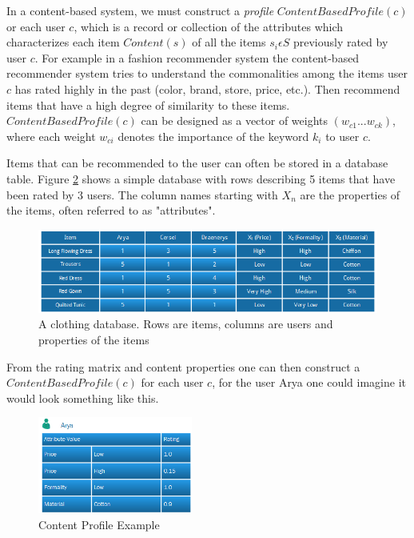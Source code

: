 In a content-based system, we must construct a \emph{profile} $ContentBasedProfile(c)$ or each user $c$, which is a record or collection of the attributes which characterizes each item $Content(s)$ of all the items $s_{i} \epsilon S$ previously rated by user $c$. For example in a fashion recommender system the content-based recommender system tries to understand the commonalities among the items user $c$ has rated highly in the past (color, brand, store, price, etc.). Then recommend items that have a high degree of similarity to these items. $ContentBasedProfile(c)$ can be designed as a vector of weights $(w_{c1} ... w_{ck})$, where each weight $w_{ci}$ denotes the importance of the keyword $k_{i}$ to user $c$.

Items that can be recommended to the user can often be stored in a database table. Figure \ref{figure:contentbaseddb} shows a simple database with rows describing 5 items that have been rated by 3 users. The column names starting with $X_{n}$ are the properties of the items, often referred to as "attributes".

\begin{figure}[H]
    \includegraphics[width=5in]{image/contentbaseddb.png}
    \centering
    \caption[A clothing database]{A clothing database. Rows are items, columns are users and properties of the items}
    \label{figure:contentbaseddb}
\end{figure}

From the rating matrix and content properties one can then construct a $ContentBasedProfile(c)$ for each user $c$, for the user Arya one could imagine it would look something like this.

\begin{figure}[H]
    \includegraphics[width=2in]{image/contentprofile.png}
    \centering
    \caption[Content Profile Example]{Content Profile Example}
    \label{figure:contentbaseddb}
\end{figure}

